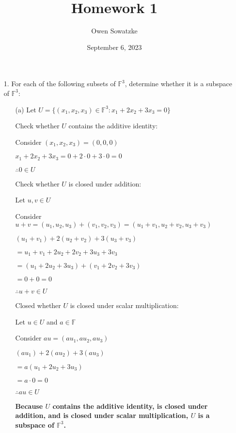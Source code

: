 \documentclass{article}
\title{Homework 1}
\author{Owen Sowatzke}
\date{September 6, 2023}
\begin{document}
	\setlength{\abovedisplayskip}{0pt}
	\setlength{\belowdisplayskip}{0pt}
		\setlength{\abovedisplayshortskip}{0pt}
	\setlength{\belowdisplayshortskip}{0pt}
	\doublespacing
	\maketitle
	
	\begin{enumerate}[nolistsep]
	
		\item[1.] For each of the following subsets of $\mathbb{F}^3$, determine whether it is a subspace of $\mathbb{F}^3$:
		
		\begin{enumerate}[nolistsep]
			
			\item[(a)] Let $U = {\{(x_1, x_2, x_3) \in \mathbb{F}^3 : x_1 + 2x_2 + 3x_3 = 0 \}}$
			
			Check whether $U$ contains the additive identity:
			
			Consider $(x_1, x_2, x_3) = (0, 0, 0)$
			
			$x_1 + 2x_2 + 3x_3 = 0 + 2 \cdot 0 + 3 \cdot 0 = 0$
			
			$\therefore 0 \in U$
			
			Check whether $U$ is closed under addition:
			
			Let $u,v \in U$
			
			Consider $u + v = (u_1, u_2, u_3) + (v_1, v_2, v_3) = (u_1 + v_1, u_2 + v_2, u_3 + v_3)$
			
			$(u_1 + v_1) + 2(u_2 + v_2) + 3(u_3 + v_3)$
			
			$ = u_1 + v_1 + 2u_2 + 2v_2 + 3u_3 + 3v_3$
			
			$ = (u_1 + 2u_2 + 3u_3) + (v_1 + 2v_2 + 3v_3)$
			
			$ = 0 + 0 = 0$
			
			$\therefore u + v \in U$
			
			Closed whether $U$ is closed under scalar multiplication:
			
			Let $u \in U$ and $a \in \mathbb{F}$
			
			Consider $au = (au_1, au_2, au_3)$
			
			$(au_1) + 2(au_2) + 3(au_3)$
			
			$ = a(u_1 + 2u_2 + 3u_3)$
			
			$ = a \cdot 0 = 0$
			
			$\therefore au \in U$
			
			\textbf{Because $U$ contains the additive identity, is closed under addition, and is closed under scalar multiplication, $U$ is a subspace of $\mathbb{F}^3$.}
			

\end{enumerate}
\end{enumerate}
\end{document}
